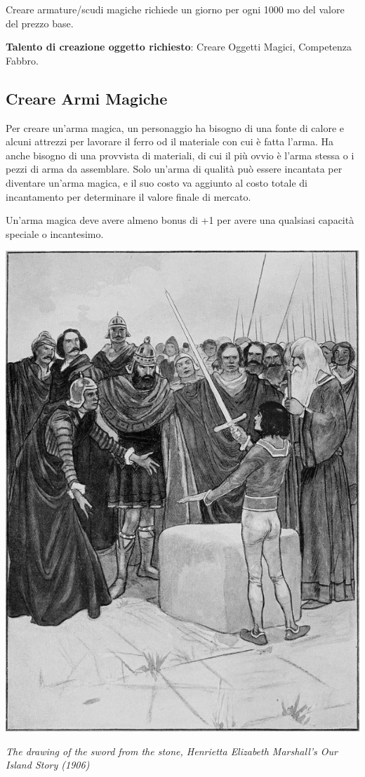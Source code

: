 \begin{multicols}{2}
Creare armature/scudi magiche richiede un giorno per ogni 1000 mo del valore del prezzo base.

\textbf{Talento di creazione oggetto richiesto}: Creare Oggetti Magici, Competenza Fabbro.

\subsection{Creare Armi Magiche}\label{crearearmimagiche}

Per creare un'arma magica, un personaggio ha bisogno di una fonte di calore e alcuni attrezzi per lavorare il ferro od il materiale con cui è fatta l'arma. Ha anche bisogno di una provvista di materiali, di cui il più ovvio è l'arma stessa o i pezzi di arma da assemblare. Solo un'arma di qualità può essere incantata per diventare un'arma magica, e il suo costo va aggiunto al costo totale di incantamento per determinare il valore finale di mercato.

Un'arma magica deve avere almeno bonus di +1 per avere una qualsiasi capacità speciale o incantesimo.

\medskip

\begin{center}
\includegraphics[width=0.6\linewidth]{immagini/exacaliburfuori.png}

\emph{The drawing of the sword from the stone, Henrietta Elizabeth Marshall's Our Island Story (1906)}
\end{center}


\end{multicols}
